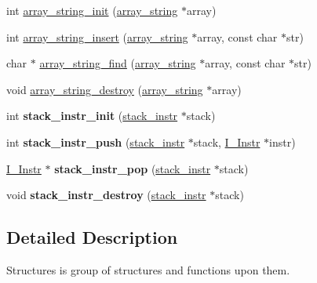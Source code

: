 \begin{DoxyCompactItemize}
\item 
int \hyperlink{group__structures_ga003cb42993ea69300701cbbd424ec9d7}{array\+\_\+string\+\_\+init} (\hyperlink{structarray__string}{array\+\_\+string} $\ast$array)
\item 
int \hyperlink{group__structures_ga7d9cf58a02819262c3b5013a0123407a}{array\+\_\+string\+\_\+insert} (\hyperlink{structarray__string}{array\+\_\+string} $\ast$array, const char $\ast$str)
\item 
char $\ast$ \hyperlink{group__structures_ga2f60bd4192abb5c7055bd60d27e833f1}{array\+\_\+string\+\_\+find} (\hyperlink{structarray__string}{array\+\_\+string} $\ast$array, const char $\ast$str)
\item 
void \hyperlink{group__structures_gafa9efea7fd8eca46fb047e80200447c5}{array\+\_\+string\+\_\+destroy} (\hyperlink{structarray__string}{array\+\_\+string} $\ast$array)
\item 
int {\bfseries stack\+\_\+instr\+\_\+init} (\hyperlink{structstack__instr}{stack\+\_\+instr} $\ast$stack)\hypertarget{group__structures_ga3d80fa25c9bfc5c70b1e44df07d8855d}{}\label{group__structures_ga3d80fa25c9bfc5c70b1e44df07d8855d}

\item 
int {\bfseries stack\+\_\+instr\+\_\+push} (\hyperlink{structstack__instr}{stack\+\_\+instr} $\ast$stack, \hyperlink{structI__Instr}{I\+\_\+\+Instr} $\ast$instr)\hypertarget{group__structures_ga864541f1cb8efc46c86a9bc17389165a}{}\label{group__structures_ga864541f1cb8efc46c86a9bc17389165a}

\item 
\hyperlink{structI__Instr}{I\+\_\+\+Instr} $\ast$ {\bfseries stack\+\_\+instr\+\_\+pop} (\hyperlink{structstack__instr}{stack\+\_\+instr} $\ast$stack)\hypertarget{group__structures_gae6627e4630a7c9c1e9c3d3deb4b600e1}{}\label{group__structures_gae6627e4630a7c9c1e9c3d3deb4b600e1}

\item 
void {\bfseries stack\+\_\+instr\+\_\+destroy} (\hyperlink{structstack__instr}{stack\+\_\+instr} $\ast$stack)\hypertarget{group__structures_ga1708d1d64f1dfce8fa57d0c6e55bc03b}{}\label{group__structures_ga1708d1d64f1dfce8fa57d0c6e55bc03b}

\end{DoxyCompactItemize}


\subsection{Detailed Description}
Structures is group of structures and functions upon them. 


